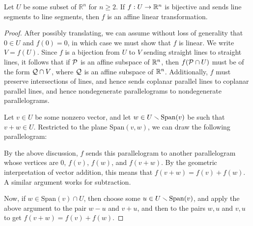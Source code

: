 \begin{theorem} \label{thm:geometric_algebra}
  Let $U$ be some subset of $\mathbb{R}^n$ for $n\geq 2$.  If $f: U\to\mathbb{R}^n$ is 
  bijective and sends line segments  to  line segments, then $f$ is an affine linear 
  transformation.
\end{theorem}
\begin{proof}
  After possibly translating, we can assume without loss of generality that 
  $0\in U$ and $f(0) = 0$, in which 
  case we must show that $f$ is linear. We write $V = f(U)$. 
  Since $f$ is a bijection  from $U$ to $V$ 
  sending straight lines to straight lines, it follows that 
  if $\mathcal{P}$ is an affine subspace of $\mathbb{R}^n$, then 
  $f(\mathcal{P}\cap U)$ must be of the form $\mathcal{Q}\cap V$, where 
  $\mathcal{Q}$ is an affine subspace of $\mathbb{R}^n$.
  Additionally, $f$ must preserve intersections of 
  lines, and hence sends coplanar parallel lines to coplanar 
  parallel lines, and hence nondegenerate parallelograms 
  to nondegenerate parallelograms.

  Let $v\in U$ be some nonzero vector, and let 
  $w\in U\smallsetminus \mathrm{Span}(v)$ be such that 
  $v+w\in U$.
  Restricted to the plane $\mathrm{Span}(v,w)$, 
  we can draw the following parallelogram:
  \begin{figure}[!h]
    \centering
  \end{figure}
 
 
  By the above discussion, $f$ sends this parallelogram 
  to another parallelogram whose vertices are 
  $0$, $f(v)$, $f(w)$, and $f(v+w)$. By the geometric 
  interpretation of vector addition, this means that 
  $f(v+w) = f(v)+f(w)$. A similar argument works for 
  subtraction.

  Now, if $w\in \mathrm{Span}(v)\cap U$, then choose some 
  $u\in U\smallsetminus \mathrm{Span}(v)$, and apply the above argument to 
  the pair $w-u$ and $v+u$, and then to the pairs 
  $w,u$ and $v,u$ to get $f(v+w) = f(v) + f(w)$.


\end{proof}
